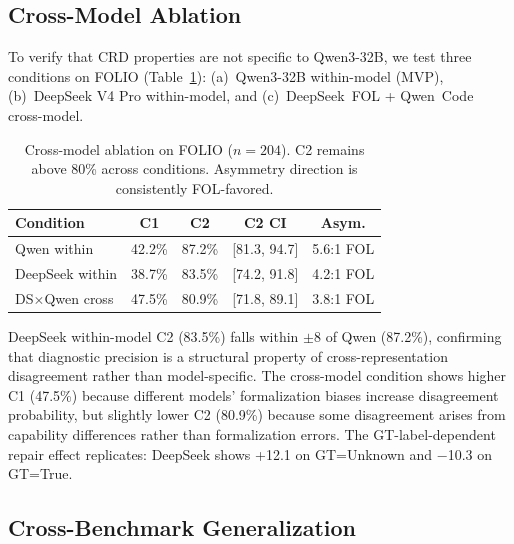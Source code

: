 \documentclass[11pt,a4paper]{article}
\newcommand{\pp}{\text{pp}}
\begin{document}
\subsection{Cross-Model Ablation}
\label{sec:cross_model}

To verify that CRD properties are not specific to Qwen3-32B, we test three conditions on FOLIO (Table~\ref{tab:cross_model}): (a)~Qwen3-32B within-model (MVP), (b)~DeepSeek V4 Pro within-model, and (c)~DeepSeek~FOL + Qwen~Code cross-model.

\begin{table}[t]
\centering
\small
\begin{tabular}{lcccc}
\toprule
\textbf{Condition} & \textbf{C1} & \textbf{C2} & \textbf{C2 CI} & \textbf{Asym.} \\
\midrule
Qwen within & 42.2\% & 87.2\% & [81.3, 94.7] & 5.6:1 FOL \\
DeepSeek within & 38.7\% & 83.5\% & [74.2, 91.8] & 4.2:1 FOL \\
DS$\times$Qwen cross & 47.5\% & 80.9\% & [71.8, 89.1] & 3.8:1 FOL \\
\bottomrule
\end{tabular}
\caption{Cross-model ablation on FOLIO ($n\!=\!204$). C2 remains above 80\% across conditions. Asymmetry direction is consistently FOL-favored.}
\label{tab:cross_model}
\end{table}

DeepSeek within-model C2 (83.5\%) falls within $\pm$8\pp{} of Qwen (87.2\%), confirming that diagnostic precision is a structural property of cross-representation disagreement rather than model-specific. The cross-model condition shows higher C1 (47.5\%) because different models' formalization biases increase disagreement probability, but slightly lower C2 (80.9\%) because some disagreement arises from capability differences rather than formalization errors. The GT-label-dependent repair effect replicates: DeepSeek shows +12.1\pp{} on GT=Unknown and $-$10.3\pp{} on GT=True.

\subsection{Cross-Benchmark Generalization}
\label{sec:cross_benchmark}
\end{document}
